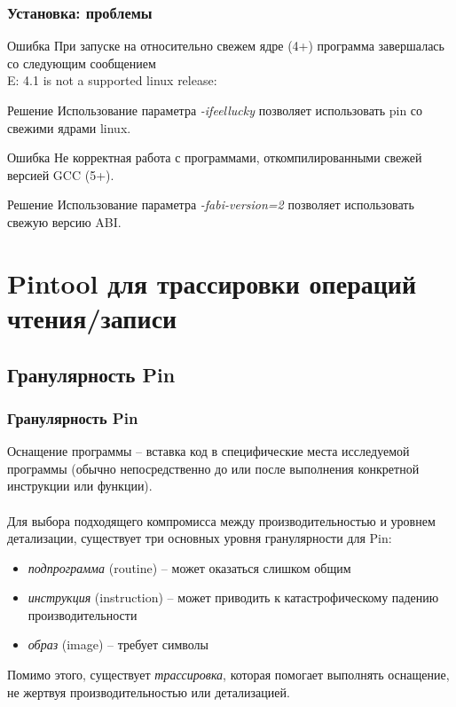 \documentclass{beamer}
\begin{document}
\begin{frame}
\frametitle{Установка: проблемы}

\begin{block}{Ошибка}
При запуске на относительно свежем ядре (4+) программа завершалась со следующим сообщением\\
E: 4.1 is not a supported linux release:
\end{block}

\begin{block}{Решение}
Использование параметра \textit{-ifeellucky} позволяет использовать pin со свежими ядрами linux.
\end{block}

\begin{block}{Ошибка}
Не корректная работа с программами, откомпилированными свежей версией GCC (5+).
\end{block}

\begin{block}{Решение}
Использование параметра \textit{-fabi-version=2} позволяет использовать свежую версию ABI.
\end{block}

\end{frame}

\section{Pintool для трассировки операций чтения/записи}
\subsection{Гранулярность Pin}

\begin{frame}
\frametitle{Гранулярность Pin}
Оснащение программы -- вставка код в специфические места исследуемой программы (обычно непосредственно до или после выполнения конкретной инструкции или функции).\\~\\

Для выбора подходящего компромисса между производительностью и уровнем детализации, существует три основных уровня гранулярности для Pin:
\begin{itemize}
\item \textit{подпрограмма} (routine) -- может оказаться слишком общим
\item \textit{инструкция} (instruction) -- может приводить к катастрофическому падению производительности
\item \textit{образ} (image) -- требует символы
\end{itemize}

Помимо этого, существует \textit{трассировка}, которая помогает выполнять оснащение, не жертвуя производительностью или детализацией.
\end{frame}
\end{document}
